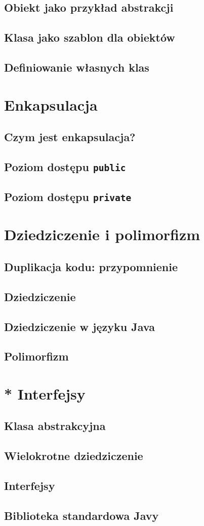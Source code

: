 \documentclass[11pt]{book}
\begin{document}
\section{Obiekt jako przykład abstrakcji}
\section{Klasa jako szablon dla obiektów}
\section{Definiowanie własnych klas}

\chapter{Enkapsulacja}
\section{Czym jest enkapsulacja?}
\section{Poziom dostępu \texttt{public}}
\section{Poziom dostępu \texttt{private}}

\chapter{Dziedziczenie i polimorfizm}
\section{Duplikacja kodu: przypomnienie}
\section{Dziedziczenie}
\section{Dziedziczenie w języku Java}
\section{Polimorfizm}

\chapter{* Interfejsy}
\section{Klasa abstrakcyjna}
\section{Wielokrotne dziedziczenie}
\section{Interfejsy}
\section{Biblioteka standardowa Javy}
\end{document}
